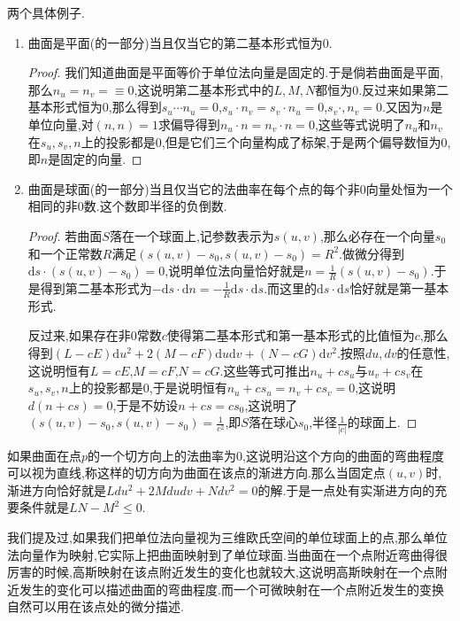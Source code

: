 两个具体例子.
\begin{enumerate}
	\item 曲面是平面(的一部分)当且仅当它的第二基本形式恒为0.
	\begin{proof}
		
		我们知道曲面是平面等价于单位法向量是固定的.于是倘若曲面是平面,那么$n_u=n_v=\equiv0$,这说明第二基本形式中的$L,M,N$都恒为0.反过来如果第二基本形式恒为0,那么得到$s_u\cdots n_u=0$,$s_u\cdot n_v=s_v\cdot n_u=0$,$s_v\cdot,n_v=0$.又因为$n$是单位向量,对$(n,n)=1$求偏导得到$n_u\cdot n=n_v\cdot n=0$,这些等式说明了$n_u$和$n_v$在$s_u,s_v,n$上的投影都是0,但是它们三个向量构成了标架,于是两个偏导数恒为0,即$n$是固定的向量.
	\end{proof}
    \item 曲面是球面(的一部分)当且仅当它的法曲率在每个点的每个非0向量处恒为一个相同的非0数.这个数即半径的负倒数.
    \begin{proof}
    	
    	若曲面$S$落在一个球面上,记参数表示为$s(u,v)$,那么必存在一个向量$s_0$和一个正常数$R$满足$(s(u,v)-s_0,s(u,v)-s_0)=R^2$.做微分得到$\mathrm{d}s\cdot(s(u,v)-s_0)=0$,说明单位法向量恰好就是$n=\frac{1}{R}(s(u,v)-s_0)$.于是得到第二基本形式为$-\mathrm{d}s\cdot\mathrm{d}n=-\frac{1}{R}\mathrm{d}s\cdot\mathrm{d}s$.而这里的$\mathrm{d}s\cdot\mathrm{d}s$恰好就是第一基本形式.
    	
    	反过来,如果存在非0常数$c$使得第二基本形式和第一基本形式的比值恒为$c$,那么得到$(L-cE)\mathrm{d}u^2+2(M-cF)\mathrm{d}u\mathrm{d}v+(N-cG)\mathrm{d}v^2$.按照$du,dv$的任意性,这说明恒有$L=cE$,$M=cF$,$N=cG$.这些等式可推出$n_u+cs_u$与$u_v+cs_v$在$s_u,s_v,n$上的投影都是0,于是说明恒有$n_u+cs_u=n_v+cs_v=0$,这说明$d(n+cs)=0$,于是不妨设$n+cs=cs_0$,这说明了$(s(u,v)-s_0,s(u,v)-s_0)=\frac{1}{c^2}$,即$S$落在球心$s_0$,半径$\frac{1}{|c|}$的球面上.
    \end{proof}
\end{enumerate}

如果曲面在点$p$的一个切方向上的法曲率为0,这说明沿这个方向的曲面的弯曲程度可以视为直线,称这样的切方向为曲面在该点的渐进方向.那么当固定点$(u,v)$时,渐进方向恰好就是$Ldu^2+2Mdudv+Ndv^2=0$的解.于是一点处有实渐进方向的充要条件就是$LN-M^2\le 0$.

我们提及过,如果我们把单位法向量视为三维欧氏空间的单位球面上的点,那么单位法向量作为映射,它实际上把曲面映射到了单位球面.当曲面在一个点附近弯曲得很厉害的时候,高斯映射在该点附近发生的变化也就较大,这说明高斯映射在一个点附近发生的变化可以描述曲面的弯曲程度.而一个可微映射在一个点附近发生的变换自然可以用在该点处的微分描述.

